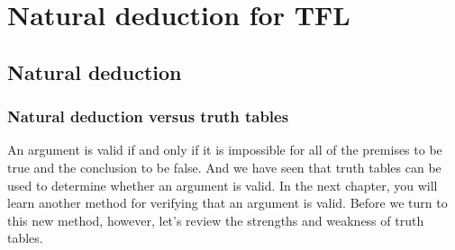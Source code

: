 \graphicspath{{figures--proofs/}}
\part{Natural deduction for TFL}
\label{ch.NDTFL}

\chapter{Natural deduction}\label{s:NDVeryIdea}

\section{Natural deduction versus truth tables}

An argument is valid if and only if it is impossible for all of the premises to be true and the conclusion to be false. And we have seen that truth tables can be used to determine whether an argument is valid. In the next chapter, you will learn another method for verifying that an argument is valid. Before we turn to this new method, however, let’s review the strengths and weakness of truth tables.

